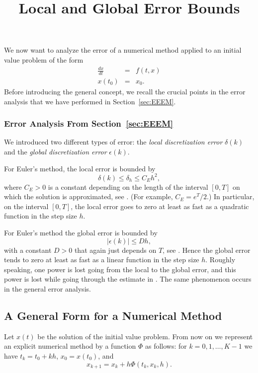 \documentclass{ximera}
\title{Local and Global Error Bounds}
\begin{document}
\begin{abstract}
\end{abstract}
\maketitle


\label{sec:LGEE}

We now want to analyze the error of a numerical method applied
to an initial value problem of the form
\begin{eqnarray*}
\frac{dx}{dt} & = & f(t,x)\\
 x(t_0) & = & x_0.
\end{eqnarray*}
Before introducing the general concept, we recall the crucial points 
in the error analysis that we have performed in Section~\ref{sec:EEEM}.  

\subsubsection*{Error Analysis From Section~\ref{sec:EEEM}}

We introduced two different types
of error: the {\em local discretization error\/} $\delta(k)$ and the 
{\em global discretization error\/} $\epsilon(k)$.  

For Euler's method, the local error is bounded by
\[
\delta(k)\le \delta_h \le C_E h^2,
\]
where $C_E >0$ is a constant depending on the length of the interval 
$[0,T]$ on which the solution is approximated, see .  
(For example, $C_E =e^T/2$.)  In particular, on the interval
$[0,T]$, the local error goes to zero at least as fast as a 
quadratic function in the step size $h$.

For Euler's method the global error is bounded by
\[
|\epsilon(k)|\le Dh,
\]
with a constant $D>0$ that again just depends on $T$, see 
.  Hence the global error tends to zero at least as fast 
as a linear function in the step size $h$.  Roughly speaking, one power 
is lost going from the local to the global error, and this power is
lost while going through the estimate in .  The same
phenomenon occurs in the general error analysis.

\subsection*{A General Form for a Numerical Method}

Let $x(t)$ be the solution of the initial value problem.
From now on we represent an explicit numerical 
method by a function $\Phi$
as follows: for $k=0,1,\ldots,K-1$ we have $t_k=t_0 + kh$, $x_0 = x(t_0)$,
and
\[
x_{k+1} = x_k + h\Phi(t_k,x_k,h).
\]
\end{document}
